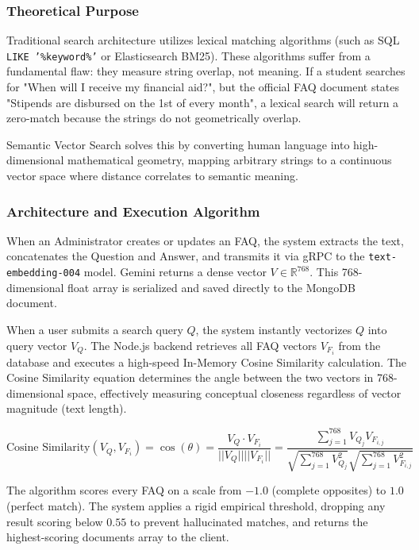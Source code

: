 \documentclass[12pt,a4paper]{article}
\begin{document}
\subsubsection{Theoretical Purpose}
Traditional search architecture utilizes lexical matching algorithms (such as SQL \texttt{LIKE '\%keyword\%'} or Elasticsearch BM25). These algorithms suffer from a fundamental flaw: they measure string overlap, not meaning. If a student searches for "When will I receive my financial aid?", but the official FAQ document states "Stipends are disbursed on the 1st of every month", a lexical search will return a zero-match because the strings do not geometrically overlap. 

Semantic Vector Search solves this by converting human language into high-dimensional mathematical geometry, mapping arbitrary strings to a continuous vector space where distance correlates to semantic meaning.

\subsubsection{Architecture and Execution Algorithm}
When an Administrator creates or updates an FAQ, the system extracts the text, concatenates the Question and Answer, and transmits it via gRPC to the \texttt{text-embedding-004} model. Gemini returns a dense vector $V \in \mathbb{R}^{768}$. This 768-dimensional float array is serialized and saved directly to the MongoDB document.

When a user submits a search query $Q$, the system instantly vectorizes $Q$ into query vector $V_Q$. The Node.js backend retrieves all FAQ vectors $V_{F_i}$ from the database and executes a high-speed In-Memory Cosine Similarity calculation. The Cosine Similarity equation determines the angle between the two vectors in 768-dimensional space, effectively measuring conceptual closeness regardless of vector magnitude (text length).

\begin{equation}
    \text{Cosine Similarity}(V_Q, V_{F_i}) = \cos(\theta) = \frac{V_Q \cdot V_{F_i}}{||V_Q|| ||V_{F_i}||} = \frac{\sum_{j=1}^{768} V_{Q_j} V_{F_{i,j}}}{\sqrt{\sum_{j=1}^{768} V_{Q_j}^2} \sqrt{\sum_{j=1}^{768} V_{F_{i,j}}^2}}
\end{equation}

The algorithm scores every FAQ on a scale from $-1.0$ (complete opposites) to $1.0$ (perfect match). The system applies a rigid empirical threshold, dropping any result scoring below $0.55$ to prevent hallucinated matches, and returns the highest-scoring documents array to the client.
\end{document}
